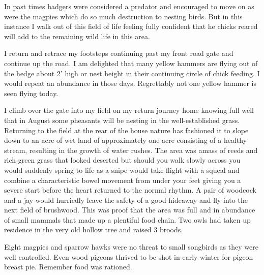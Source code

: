 In past times badgers were considered a predator and encouraged to move on as
were the magpies which do so much destruction to nesting birds.  But in this
instance I walk out of this field of life feeling fully confident that he
chicks reared will add to the remaining wild life in this area.

I return and retrace my footsteps continuing past my front road gate and
continue up the road.  I am delighted that many yellow hammers are flying out
of the hedge about 2' high or nest height in their continuing circle of chick
feeding.  I would repeat an abundance in those days.  Regrettably not one
yellow hammer is seen flying today.

I climb over the gate into my field on my return journey home knowing full well
that in August some pheasants will be nesting in the well-established grass.
Returning to the field at the rear of the house nature has fashioned it to
slope down to an acre of wet land of approximately one acre consisting of a
healthy stream, resulting in the growth of water rushes.  The area was amass of
reeds and rich green grass that looked deserted but should you walk slowly
across you would suddenly spring to life as a snipe would take flight with a
squeal and combine a characteristic bowel movement from under your feet giving
you a severe start before the heart returned to the normal rhythm.  A pair of
woodcock and a jay would hurriedly leave the safety of a good hideaway and fly
into the next field of brushwood.  This was proof that the area was full and in
abundance of small mammals that made up a plentiful food chain.  Two owls had
taken up residence in the very old hollow tree and raised 3 broods.

Eight magpies and sparrow hawks were no threat to small songbirds as they were
well controlled.  Even wood pigeons thrived to be shot in early winter for
pigeon breast pie.  Remember food was rationed.

